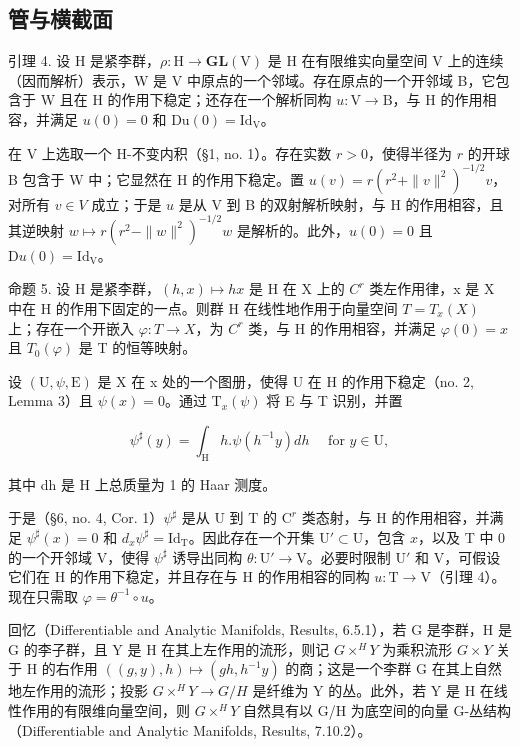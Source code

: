 \subsection{管与横截面}

引理 4. 设 H 是紧李群，\(\rho : \mathrm{H} \to \mathbf{GL}(\mathrm{V})\) 是 H 在有限维实向量空间 V 上的连续（因而解析）表示，W 是 V 中原点的一个邻域。存在原点的一个开邻域 B，它包含于 W 且在 H 的作用下稳定；还存在一个解析同构 \(u: \mathrm{V} \to \mathrm{B}\)，与 H 的作用相容，并满足 \(u(0) = 0\) 和 \(\mathrm{Du}(0) = \mathrm{Id}_{\mathrm{V}}\)。

在 V 上选取一个 H-不变内积（§1, no. 1）。存在实数 \(r > 0\)，使得半径为 \(r\) 的开球 B 包含于 W 中；它显然在 H 的作用下稳定。置 \(u(v) = r(r^2 + \|v\|^2)^{-1/2} v\)，对所有 \(v \in V\) 成立；于是 \(u\) 是从 V 到 B 的双射解析映射，与 H 的作用相容，且其逆映射 \(w \mapsto r(r^2 - \|w\|^2)^{-1/2} w\) 是解析的。此外，\(u(0) = 0\) 且 \(\mathrm{D}u(0) = \mathrm{Id}_{\mathrm{V}}\)。

命题 5. 设 H 是紧李群，\((h,x)\mapsto hx\) 是 H 在 X 上的 \(C^{r}\) 类左作用律，x 是 X 中在 H 的作用下固定的一点。则群 H 在线性地作用于向量空间 \(T=T_{x}(X)\) 上；存在一个开嵌入 \(\varphi:T\to X\)，为 \(C^{r}\) 类，与 H 的作用相容，并满足 \(\varphi(0)=x\) 且 \(T_{0}(\varphi)\) 是 T 的恒等映射。

设 \((\mathrm{U},\psi,\mathrm{E})\) 是 X 在 x 处的一个图册，使得 U 在 H 的作用下稳定（no. 2, Lemma 3）且 \(\psi(x)=0\)。通过 \(\mathrm{T}_{x}(\psi)\) 将 E 与 T 识别，并置

\[
\psi^ {\sharp} (y) = \int_ {\mathrm{H}} h. \psi (h ^ {- 1} y) d h \quad \text { for } y \in \mathrm{U},
\]

其中 dh 是 H 上总质量为 1 的 Haar 测度。

于是（§6, no. 4, Cor. 1）\(\psi^{\sharp}\) 是从 U 到 T 的 \(\mathrm{C}^r\) 类态射，与 H 的作用相容，并满足 \(\psi^{\sharp}(x) = 0\) 和 \(d_x\psi^\sharp = \mathrm{Id}_\mathrm{T}\)。因此存在一个开集 \(\mathrm{U}' \subset \mathrm{U}\)，包含 \(x\)，以及 T 中 0 的一个开邻域 V，使得 \(\psi^{\sharp}\) 诱导出同构 \(\theta: \mathrm{U}' \to \mathrm{V}\)。必要时限制 \(\mathrm{U}'\) 和 V，可假设它们在 H 的作用下稳定，并且存在与 H 的作用相容的同构 \(u: \mathrm{T} \to \mathrm{V}\)（引理 4）。现在只需取 \(\varphi = \theta^{-1} \circ u\)。

回忆（Differentiable and Analytic Manifolds, Results, 6.5.1），若 G 是李群，H 是 G 的李子群，且 Y 是 H 在其上左作用的流形，则记 \(G \times^{H}Y\) 为乘积流形 \(G \times Y\) 关于 H 的右作用 \(((g,y),h) \mapsto (gh,h^{-1}y)\) 的商；这是一个李群 G 在其上自然地左作用的流形；投影 \(G \times^{H}Y \to G/H\) 是纤维为 Y 的丛。此外，若 Y 是 H 在线性作用的有限维向量空间，则 \(G \times^{H}Y\) 自然具有以 G/H 为底空间的向量 G-丛结构（Differentiable and Analytic Manifolds, Results, 7.10.2）。

